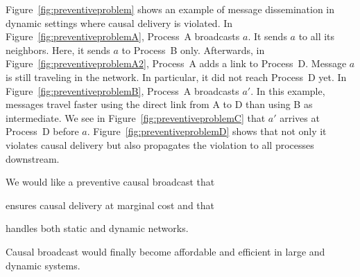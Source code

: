 \begin{figure*}
  \begin{center}
    \hspace{20pt}
    \hspace{20pt}
    \hspace{20pt}
    \hspace{20pt}
    \caption{\label{fig:preventiveproblem}Preventive causal broadcast may
      violate causal order in dynamic settings.}
  \end{center}
\end{figure*}

Figure~\ref{fig:preventiveproblem} shows an example of message dissemination in
dynamic settings where causal delivery is violated. In
Figure~\ref{fig:preventiveproblemA}, Process~A broadcasts $a$. It sends $a$ to
all its neighbors. Here, it sends $a$ to Process~B only.  Afterwards, in
Figure~\ref{fig:preventiveproblemA2}, Process~A adds a link to
Process~D. Message $a$ is still traveling in the network. In particular, it did
not reach Process~D yet. In Figure~\ref{fig:preventiveproblemB}, Process~A
broadcasts $a'$. In this example, messages travel faster using the direct link
from A to D than using B as intermediate.  We see in
Figure~\ref{fig:preventiveproblemC} that $a'$ arrives at Process~D before
$a$. Figure~\ref{fig:preventiveproblemD} shows that not only it violates causal
delivery but also propagates the violation to all processes downstream.

We would like a preventive causal broadcast that
\begin{inparaenum}[(i)]
\item ensures causal delivery at marginal cost and that
\item handles both static and dynamic networks.
\end{inparaenum}
Causal broadcast would finally become affordable and efficient in large and
dynamic systems.

